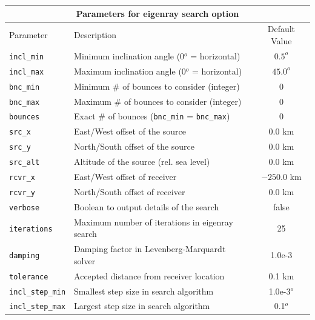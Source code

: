 \documentclass[10pt]{article}
\begin{document}
\begin{tabular}{ | l | l | c | }
  \hline
  \multicolumn{3}{|c|}{\textbf{Parameters for eigenray search option}} \\
  \hline
  Parameter & Description & Default Value \\
  \hline \hline
 \verb=incl_min= 		& Minimum inclination angle (0\(^o\) = horizontal)			& \(0.5^o\)	\\
 \verb=incl_max= 		& Maximum inclination angle (0\(^o\) = horizontal)			& \(45.0^o\) \\ \hline
 \verb=bnc_min=		& Minimum \# of bounces to consider (integer) 				& 0 \\ 
 \verb=bnc_max=		& Maximum \# of bounces to consider (integer) 				& 0 \\ 
 \verb=bounces=		& Exact \# of bounces (\verb=bnc_min= = \verb=bnc_max=)	& 0 \\ \hline
 \verb=src_x=  			& East/West offset of the source						& \(0.0\) km \\
 \verb=src_y=  			& North/South offset of the source						& \(0.0\) km \\
 \verb=src_alt=  		& Altitude of the source (rel. sea level)					& \(0.0\) km \\ \hline
 \verb=rcvr_x= 			& East/West offset of receiver							& \(-250.0\) km	\\
 \verb=rcvr_y= 			& North/South offset of receiver							& \(0.0\) km \\ \hline
 \verb=verbose=		& Boolean to output details of the search					& false \\
 \verb=iterations=		& Maximum number of iterations in eigenray search			& 25 \\ 
 \verb=damping=		& Damping factor in Levenberg-Marquardt solver			& 1.0e-3 \\
 \verb=tolerance=		& Accepted distance from receiver location				& 0.1 km \\
 \verb=incl_step_min=	& Smallest step size in search algorithm					& 1.0e-3\(^o\)\\
 \verb=incl_step_max=	& Largest step size in search algorithm					& 0.1\(^o\) \\ \hline
\end{tabular}

\vspace{0.01\textheight}
\end{document}
